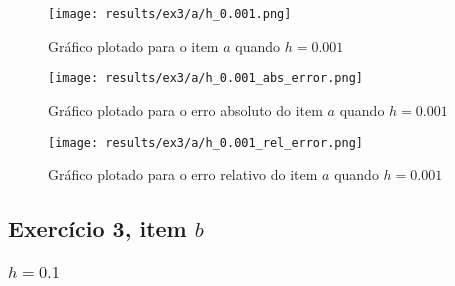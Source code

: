 \documentclass[12pt]{article}
\begin{document}
\begin{figure}[H]
    \texttt{[image: results/ex3/a/h\_0.001.png]}
    \caption{Gráfico plotado para o item $a$ quando $h=0.001$}
\end{figure}

\begin{figure}[H]
    \texttt{[image: results/ex3/a/h\_0.001\_abs\_error.png]}
    \caption{Gráfico plotado para o erro absoluto do item $a$ quando $h=0.001$}
\end{figure}

\begin{figure}[H]
    \texttt{[image: results/ex3/a/h\_0.001\_rel\_error.png]}
    \caption{Gráfico plotado para o erro relativo do item $a$ quando $h=0.001$}
\end{figure}
\subsection{Exercício 3, item $b$}\subsubsection{$h=0.1$}

\begin{table}[H]
    \centering
    \caption{Valores obtidos para o item $b$ com $h=0.1$}
\end{table}
\end{document}
